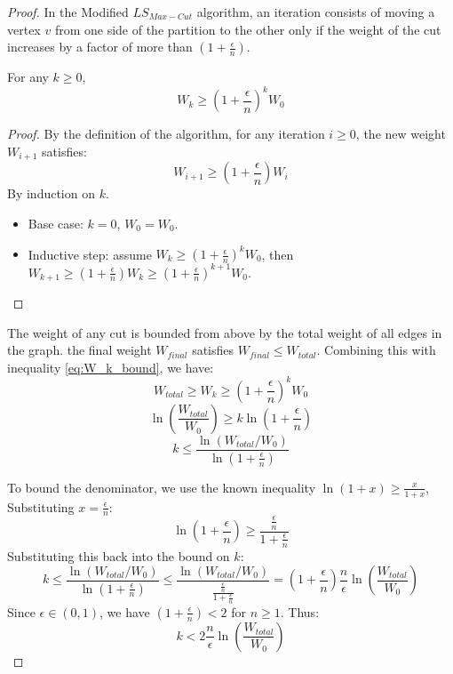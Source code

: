 \begin{proof}
In the Modified $LS_{Max-Cut}$ algorithm, an iteration consists of moving a vertex $v$ from one side of the partition to the other only if the weight of the cut increases by a factor of more than $(1 + \frac{\epsilon}{n})$.

\begin{lemma}
    For any $k \ge 0$, \begin{equation} \label{eq:W_k_bound}
        W_k \ge \left(1 + \frac{\epsilon}{n}\right)^k W_0
    \end{equation}
    \begin{proof}
        By the definition of the algorithm, for any iteration $i \ge 0$, the new weight $W_{i+1}$ satisfies:
        \begin{equation} \label{eq:W_i_bound}
            W_{i+1} \ge \left(1 + \frac{\epsilon}{n}\right) W_i
        \end{equation}
        By induction on $k$.
        \begin{itemize}
            \item Base case: $k = 0$, $W_0 = W_0$.
            \item Inductive step: assume $W_k \ge \left(1 + \frac{\epsilon}{n}\right)^k W_0$, then $W_{k+1} \ge \left(1 + \frac{\epsilon}{n}\right) W_k \ge \left(1 + \frac{\epsilon}{n}\right)^{k+1} W_0$.
        \end{itemize}
    \end{proof}
\end{lemma}

The weight of any cut is bounded from above by the total weight of all edges in the graph. the final weight $W_{final}$ satisfies $W_{final} \le W_{total}$.
Combining this with inequality \eqref{eq:W_k_bound}, we have:
\[
    W_{total} \ge W_k \ge \left(1 + \frac{\epsilon}{n}\right)^k W_0
\]
\[
    \ln\left(\frac{W_{total}}{W_0}\right) \ge k \ln\left(1 + \frac{\epsilon}{n}\right)
\]
\[
    k \le \frac{\ln(W_{total}/W_0)}{\ln\left(1 + \frac{\epsilon}{n}\right)}
\]

To bound the denominator, we use the known inequality $\ln(1+x) \ge \frac{x}{1+x}$, Substituting $x = \frac{\epsilon}{n}$:
\[
    \ln\left(1 + \frac{\epsilon}{n}\right) \ge \frac{\frac{\epsilon}{n}}{1 + \frac{\epsilon}{n}}
\]
Substituting this back into the bound on $k$:
\[
    k \le \frac{\ln(W_{total}/W_0)}{\ln\left(1 + \frac{\epsilon}{n}\right)} \le \frac{\ln(W_{total}/W_0)}{\frac{\frac{\epsilon}{n}}{1 + \frac{\epsilon}{n}}} = \left(1 + \frac{\epsilon}{n}\right) \frac{n}{\epsilon} \ln\left(\frac{W_{total}}{W_0}\right)
\]
Since $\epsilon \in (0, 1)$, we have $(1 + \frac{\epsilon}{n}) < 2$ for $n \ge 1$. Thus:
\[
    k < 2 \frac{n}{\epsilon} \ln\left(\frac{W_{total}}{W_0}\right)
\]


\end{proof}
